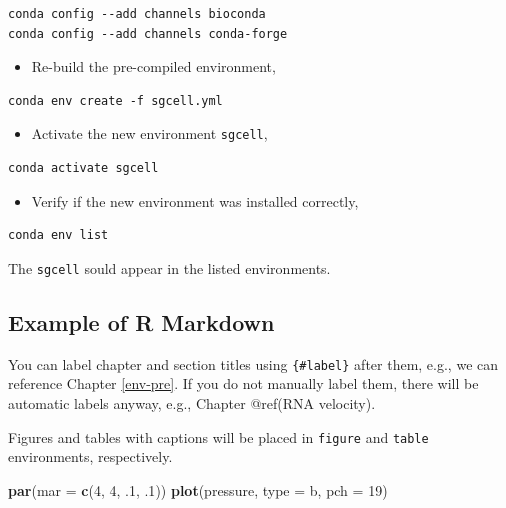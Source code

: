 \documentclass[
]{book}
\newenvironment{Shaded}{\begin{snugshade}}{\end{snugshade}}
\newcommand{\DataTypeTok}[1]{\textcolor[rgb]{0.13,0.29,0.53}{#1}}
\newcommand{\DecValTok}[1]{\textcolor[rgb]{0.00,0.00,0.81}{#1}}
\newcommand{\FloatTok}[1]{\textcolor[rgb]{0.00,0.00,0.81}{#1}}
\newcommand{\KeywordTok}[1]{\textcolor[rgb]{0.13,0.29,0.53}{\textbf{#1}}}
\newcommand{\NormalTok}[1]{#1}
\newcommand{\StringTok}[1]{\textcolor[rgb]{0.31,0.60,0.02}{#1}}
\providecommand{\tightlist}{%
  \setlength{\itemsep}{0pt}\setlength{\parskip}{0pt}}
\begin{document}
\begin{verbatim}
conda config --add channels bioconda
conda config --add channels conda-forge
\end{verbatim}

\begin{itemize}
\tightlist
\item
  Re-build the pre-compiled environment,
\end{itemize}

\begin{verbatim}
conda env create -f sgcell.yml
\end{verbatim}

\begin{itemize}
\tightlist
\item
  Activate the new environment \texttt{sgcell},
\end{itemize}

\begin{verbatim}
conda activate sgcell
\end{verbatim}

\begin{itemize}
\tightlist
\item
  Verify if the new environment was installed correctly,
\end{itemize}

\begin{verbatim}
conda env list
\end{verbatim}

The \texttt{sgcell} sould appear in the listed environments.

\hypertarget{example-of-r-markdown}{%
\subsection{Example of R Markdown}\label{example-of-r-markdown}}

You can label chapter and section titles using \texttt{\{\#label\}} after them, e.g., we can reference Chapter \ref{env-pre}. If you do not manually label them, there will be automatic labels anyway, e.g., Chapter @ref(RNA velocity).

Figures and tables with captions will be placed in \texttt{figure} and \texttt{table} environments, respectively.

\begin{Shaded}
\begin{Highlighting}[]
\KeywordTok{par}\NormalTok{(}\DataTypeTok{mar =} \KeywordTok{c}\NormalTok{(}\DecValTok{4}\NormalTok{, }\DecValTok{4}\NormalTok{, }\FloatTok{.1}\NormalTok{, }\FloatTok{.1}\NormalTok{))}
\KeywordTok{plot}\NormalTok{(pressure, }\DataTypeTok{type =} \StringTok{\textquotesingle{}b\textquotesingle{}}\NormalTok{, }\DataTypeTok{pch =} \DecValTok{19}\NormalTok{)}
\end{Highlighting}
\end{Shaded}
\end{document}
